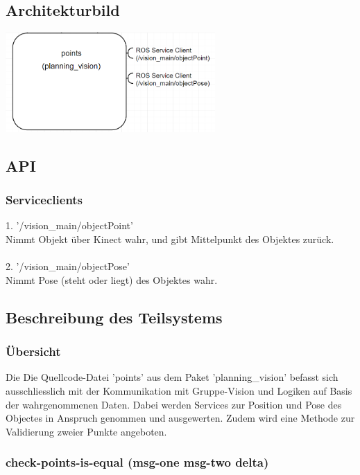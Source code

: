 \documentclass{suturo}
\begin{document}
\subsection{Architekturbild}
\begin{center} \includegraphics[width=0.6\textwidth]{img/diag_planning_vision.png} \end{center}
\subsection{API}
\subsubsection{Serviceclients}
1. '/vision\_main/objectPoint' \\
Nimmt Objekt über Kinect wahr, und gibt Mittelpunkt des Objektes zur\"uck.\\ \\
2. '/vision\_main/objectPose' \\
Nimmt Pose (steht oder liegt) des Objektes wahr.
\subsection{Beschreibung des Teilsystems}
\subsubsection{\"Ubersicht}
Die Die Quellcode-Datei 'points' aus dem Paket 'planning\_vision' befasst sich ausschliesslich mit der Kommunikation mit Gruppe-Vision und Logiken auf Basis der wahrgenommenen Daten. Dabei werden Services zur Position und Pose des Objectes in Anspruch genommen und ausgewerten. Zudem wird eine Methode zur Validierung zweier Punkte angeboten.
\subsubsection{check-points-is-equal (msg-one msg-two delta)}
\end{document}
